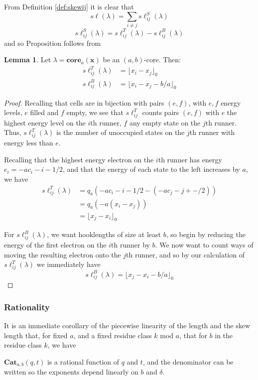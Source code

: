 \documentclass{amsart}[12pt]
\theoremstyle{definition}
\newtheorem{lemma}[dummy]{Lemma}
\newcommand{\core}{\mathbf{core}}
\newcommand{\Cat}{\mathbf{Cat}}
\newcommand{\sk}{s\ell}
\begin{document}
From Definition \ref{def:skewij} it is clear that
$$\sk(\lambda)=\sum_{i\neq j}\sk^S_{ij}(\lambda)$$
$$\sk_{ij}^S(\lambda)=\sk_{ij}^T(\lambda)-\sk^B_{ij}(\lambda)$$
and so Proposition follows from

\begin{lemma}
Let $\lambda=\core_a(\mathbf{x})$ be an $(a,b)$-core.  Then:
\begin{align*}
\sk_{ij}^T(\lambda)&=\lfloor x_i-x_j\rfloor_0 \\
\sk_{ij}^B(\lambda)&=\lfloor x_i-x_j-b/a\rfloor_0
\end{align*}
\end{lemma}

\begin{proof}
Recalling that cells are in bijection with pairs $(e, f)$, with $e, f$ energy levels, $e$ filled and $f$ empty, we see that $\sk^T_{ij}$ counts pairs $(e, f)$ with $e$ the highest energy level on the $i$th runner, $f$ any empty state on the $j$th runner.  Thus, $\sk^T_{ij}(\lambda)$ is the number of unoccupied states on the $j$th runner with energy less than $e$.

Recalling that the highest energy electron on the $i$th runner has energy $e_i=-ac_i-i-1/2$, and that the energy of each state to the left increases by $a$, we have  
\begin{align*}
\sk_{ij}^T(\lambda)&=q_a\left(-ac_i-i-1/2-(-ac_j-j+-/2)\right) \\
&=q_a(-a(x_i-x_j)) \\
&=\lfloor x_j-x_i\rfloor_0
\end{align*}

For $\sk_{ij}^B(\lambda)$, we want hooklengths of size at least $b$, so begin by reducing the energy of the first electron on the $i$th runner by $b$.  We now want to count ways of moving the resulting electron onto the $j$th runner, and so by our calculation of $\sk_{ij}^T(\lambda)$ we immediately have
$$\sk_{ij}^B(\lambda)=\lfloor x_j-x_i-b/a\rfloor_0$$
\end{proof}


\subsubsection{Rationality}

It is an immediate corollary of the piecewise linearity of the length and the skew length that, for fixed $a$, and a fixed residue class $k$ mod $a$, that for $b$ in the residue class $k$, we have

$\Cat_{a,b}(q,t)$ is a rational function of $q$ and $t$, and the denominator can be written so the exponents depend linearly on $b$ and $\delta$.
\end{document}
